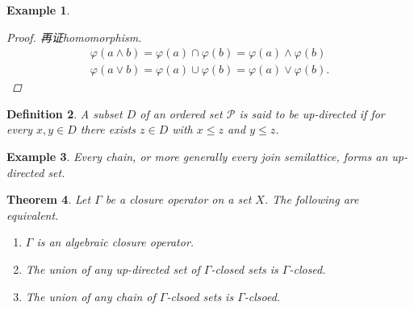 \documentclass{article}
\newtheorem{theorem}{Theorem}[section]
\newtheorem{example}[theorem]{Example}
\newtheorem{definition}[theorem]{Definition}
\newcommand\lattice{\mathcal{L}}
\begin{document}
\begin{example}
\begin{proof}
再证homomorphism. 
$$
\begin{aligned}
\varphi(a \wedge b) = \varphi(a) \cap \varphi(b) = \varphi(a) \wedge \varphi(b) \\
\varphi(a \vee b) = \varphi(a) \cup \varphi(b) = \varphi(a) \vee \varphi(b).
\end{aligned}
$$

\end{proof}	

\end{example}


\newpage
\begin{definition}
\rm A subset $D$ of an ordered set $\mathcal{P}$ is said to be {\color{red} \emph{up-directed}} if for every $x,y \in D$ there exists $z \in D$ with $x \leq z$ and $y \leq z$.
\end{definition}

\begin{example}
\rm Every chain, or more generally every join semilattice, forms an up-directed set.
\end{example}

\begin{theorem}
\rm Let $\Gamma$ be a closure operator on a set $X$. The following are equivalent.
\begin{enumerate}
	\item $\Gamma$ is an algebraic closure operator.
	\item The union of any up-directed set of $\Gamma$-closed sets is $\Gamma$-closed. 
	\item The union of any chain of $\Gamma$-clsoed sets is $\Gamma$-clsoed.
\end{enumerate}
\end{theorem}
\end{document}
